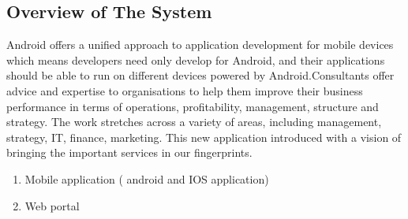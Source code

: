\documentclass[a4paper,12pt]{article}
\begin{document}
\vspace{2mm}
\newpage
\subsection{Overview of The System}\vspace{5mm}
Android offers a unified approach to application development for mobile devices which means developers need only develop for Android, and their applications should be able to run on different devices powered by Android.Consultants offer advice and expertise to organisations to help them improve their business performance in terms of operations, profitability, management, structure and strategy. The work stretches across a variety of areas, including management, strategy, IT, finance, marketing. This new application introduced with a vision of bringing the important services in our fingerprints.
 \par  \vspace{2mm}              
 \begin{enumerate}
\item Mobile  application  ( android and IOS application)
\item Web portal
\end{enumerate}
\end{document}

